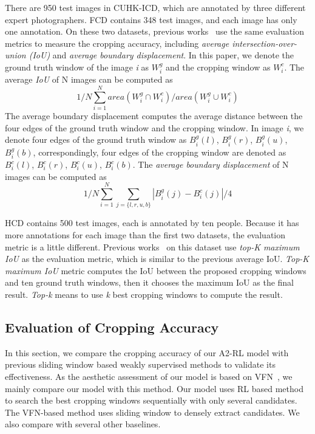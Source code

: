 \documentclass[10pt,twocolumn,letterpaper]{article}
\begin{document}
There are 950 test images in CUHK-ICD, which are annotated by three different expert photographers. FCD contains 348 test images, and each image has only one annotation. On these two datasets, previous works~\cite{yan2013learning,chen2017quantitative,chen-acmmm-2017} use the same evaluation metrics to measure the cropping accuracy, including \emph{average intersection-over-union (IoU)} and \emph{average boundary displacement}. In this paper, we denote the ground truth window of the image \emph{i} as $W_i^g$ and the cropping window as $W_i^c$. The average \emph{IoU} of N images can be computed as
\begin{equation}
1/N\sum_{i=1}^Narea(W_i^g\cap W_i^c)/area(W_i^g\cup W_i^c)
\end{equation}
The average boundary displacement computes the average distance between the four edges of the ground truth window and the cropping window. In image \emph{i}, we denote four edges of the ground truth window as $B_i^g(l)$, $B_i^g(r)$, $B_i^g(u)$, $B_i^g(b)$, correspondingly, four edges of the cropping window are denoted as $B_i^c(l)$, $B_i^c(r)$, $B_i^c(u)$, $B_i^c(b)$. The \emph{average boundary displacement} of N images can be computed as
\begin{equation}
1/N\sum_{i=1}^N\sum_{j=\{l,r,u,b\}}|B_i^g(j)-B_i^c(j)|/4
\end{equation}

HCD contains 500 test images, each is annotated by ten people. Because it has more annotations for each image than the first two datasets, the evaluation metric is a little different. Previous works~\cite{fang2014automatic,kao2017automatic} on this dataset use \emph{top-K maximum IoU} as the evaluation metric, which is similar to the previous average IoU. \emph{Top-K maximum IoU} metric computes the IoU between the proposed cropping windows and ten ground truth windows, then it chooses the maximum IoU as the final result. \emph{Top-k} means to use \emph{k} best cropping windows to compute the result.

\subsection{Evaluation of Cropping Accuracy}
In this section, we compare the cropping accuracy of our A2-RL model with previous sliding window based weakly supervised methods to validate its effectiveness. As the aesthetic assessment of our model is based on VFN~\cite{chen-acmmm-2017}, we mainly compare our model with this method. Our model uses RL based method to search the best cropping windows sequentially with only several candidates. The VFN-based method uses sliding window to densely extract candidates. We also compare with several other baselines.
\end{document}
